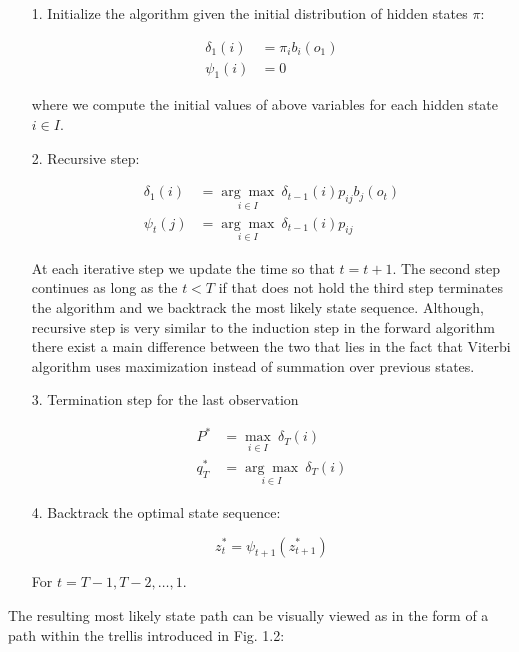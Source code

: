 \begin{itemize}
\item[1.] Initialize the algorithm given the initial distribution of hidden states $\pi$:

\begin{align}
\delta_1(i) &= \pi_i b_i(o_1)  \\
\psi_1(i)& = 0
\end{align}

where we compute the initial values of above variables for each hidden state $i \in I$.

\item[2.] Recursive step:

\begin{align}
\delta_1(i) &= \underset{i \in I}{\arg\max} \: \delta_{t-1}(i)p_{ij} b_j(o_t)  \\
\psi_t(j)& = \underset{i \in I}{\arg\max} \: \delta_{t-1}(i)p_{ij}
\end{align}

At each iterative step we update the time so that $t=t+1$. The second step continues as long as the $t<T$ if that does not hold the third step terminates the algorithm and we backtrack the most likely state sequence. Although, recursive step is very similar to the induction step in the forward algorithm there exist a main difference between the two that lies in the fact that Viterbi algorithm uses maximization instead of summation over previous states. 

\item[3.] Termination step for the last observation 

\begin{align}
P^* &= \underset{i \in I}{\max} \: \delta_{T}(i) \\
q_T^* & = \underset{i \in I}{\arg\max} \: \delta_{T}(i)
\end{align}

\item[4.] Backtrack the optimal state sequence:

\begin{equation}
z_t^* = \psi_{t+1}(z_{t+1}^*)
\end{equation}

For $t = T-1,T-2,\ldots,1$.

\end{itemize}

The resulting most likely state path can be visually viewed as in the form of a path within the trellis introduced in Fig. 1.2:

